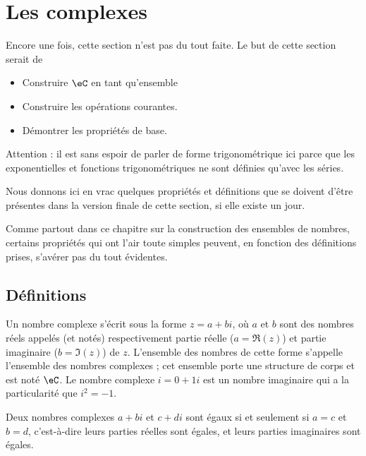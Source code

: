 \section{Les complexes}

\begin{probleme}
    Encore une fois, cette section n'est pas du tout faite. Le but de cette section serait de
    \begin{itemize}
        \item Construire \( \eC\) en tant qu'ensemble
        \item Construire les opérations courantes.
        \item Démontrer les propriétés de base.
    \end{itemize}
    Attention : il est sans espoir de parler de forme trigonométrique ici parce que les exponentielles et fonctions trigonométriques ne sont définies qu'avec les séries.

    Nous donnons ici en vrac quelques propriétés et définitions que se doivent d'être présentes dans la version finale de cette section, si elle existe un jour.

    Comme partout dans ce chapitre sur la construction des ensembles de nombres, certains propriétés qui ont l'air toute simples peuvent, en fonction des définitions prises, s'avérer pas du tout évidentes.
\end{probleme}


\subsection{Définitions}
Un nombre complexe s'écrit sous la forme $z = a + b i$, où $a$ et $b$
sont des nombres réels appelés (et notés) respectivement partie réelle
($a = \Re(z)$) et partie imaginaire ($b = \Im(z)$) de $z$. L'ensemble
des nombres de cette forme s'appelle l'ensemble des nombres complexes
; cet ensemble porte une structure de corps et est noté $\eC$. Le
nombre complexe $i = 0 + 1 i$ est un nombre imaginaire qui a la
particularité que $i^2 = -1$.

Deux nombres complexes $a + bi$ et $c + di$ sont égaux si et seulement
si $a = c$ et $b = d$, c'est-à-dire leurs parties réelles sont égales,
et leurs parties imaginaires sont égales.


